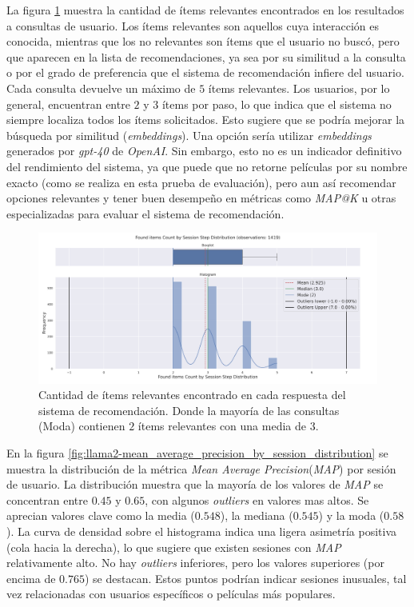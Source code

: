 \documentclass[11pt,a4paper,twoside]{thesis}
\begin{document}
La figura \ref{fig:llama2-found_items_count_by_session_step_distribution} muestra la cantidad de ítems relevantes encontrados en los resultados a consultas de usuario. Los ítems relevantes son aquellos cuya interacción es conocida, mientras que los no relevantes son ítems que el usuario no buscó, pero que aparecen en la lista de recomendaciones, ya sea por su similitud a la consulta o por el grado de preferencia que el sistema de recomendación infiere del usuario.  Cada consulta devuelve un máximo de $5$ ítems relevantes. Los usuarios, por lo general, encuentran entre $2$ y $3$ ítems por paso, lo que indica que el sistema no siempre localiza todos los ítems solicitados. Esto sugiere que se podría mejorar la búsqueda por similitud (\textit{embeddings}). Una opción sería utilizar \textit{embeddings} generados por \textit{gpt-40} de \textit{OpenAI}. Sin embargo, esto no es un indicador definitivo del rendimiento del sistema, ya que puede que no retorne películas por su nombre exacto (como se realiza en esta prueba de evaluación), pero aun así recomendar opciones relevantes y tener buen desempeño en métricas como \textit{MAP@K} u otras especializadas para evaluar el sistema de recomendación.


\begin{figure}[H]
	\centering
	\includegraphics[width=15cm]{./images/llama2/found_items_count_by_session_step_distribution.png}
	\caption{Cantidad de ítems relevantes encontrado en cada respuesta del sistema de recomendación. Donde la mayoría de las consultas (Moda) contienen $2$ ítems relevantes con una media de $3$.}
	\label{fig:llama2-found_items_count_by_session_step_distribution}
\end{figure}


En la figura \ref{fig:llama2-mean_average_precision_by_session_distribution} se muestra la distribución de la métrica \textit{Mean Average Precision}(\textit{MAP}) por sesión de usuario. La distribución muestra que la mayoría de los valores de \textit{MAP} se concentran entre $0.45$ y $0.65$, con algunos \textit{outliers} en valores mas altos. Se aprecian valores clave como la media ($0.548$), la mediana ($0.545$) y la moda ($0.58$). La curva de densidad sobre el histograma indica una ligera asimetría positiva (cola hacia la derecha), lo que sugiere que existen sesiones con \textit{MAP} relativamente alto. No hay \textit{outliers} inferiores, pero los valores superiores (por encima de $0.765$) se destacan. Estos puntos podrían indicar sesiones inusuales, tal vez relacionadas con usuarios específicos o películas más populares.
\end{document}
